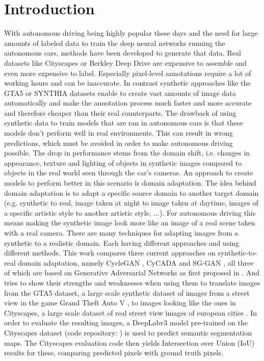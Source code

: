 \chapter{Introduction}
\label{sec:introduction}
With autonomous driving being highly popular these days and the need for large amounts of labeled data to train the deep neural networks running the autonomous cars, methods have been developed to generate that data. Real datasets like Cityscapes \cite{Cordts_2016_CVPR} or Berkley Deep Drive \cite{DBLP:journals/corr/abs-1805-04687} are expensive to assemble and even more expensive to label. Especially pixel-level annotations require a lot of working hours and can be inaccurate. In contrast synthetic approaches like the GTA5 \cite{Richter_2016_ECCV} or SYNTHIA \cite{RosCVPR16} datasets enable to create vast amounts of image data automatically and make the annotation process much faster and more accurate and therefore cheaper than their real counterparts. The drawback of using synthetic data to train models that are ran in autonomous cars is that these models don't perform well in real environments. This can result in wrong predictions, which must be avoided in order to make autonomous driving possible. The drop in performance stems from the domain shift, i.e. changes in appearance, texture and lighting of objects in synthetic images compared to objects in the real world seen through the car's cameras. An approach to create models to perform better in this scenario is domain adaptation. The idea behind domain adaptation is to adapt a specific source domain to another target domain (e.g. synthetic to real, image taken at night to image taken at daytime, images of a specific artistic style to another artistic style, ...). For autonomous driving this means making the synthetic image look more like an image of a real scene taken with a real camera. There are many techniques for adapting images from a synthetic to a realistic domain. Each having different approaches and using different methods. This work compares three current approaches on synthetic-to-real domain adaptation, namely CycleGAN \cite{DBLP:journals/corr/ZhuPIE17}, CyCADA \cite{DBLP:journals/corr/abs-1711-03213} and SG-GAN \cite{DBLP:journals/corr/abs-1801-01726}, all three of which are based on Generative Adversarial Networks as first proposed in \cite{NIPS2014_5423}. And tries to show their strengths and weaknesses when using them to translate images from the GTA5 dataset, a large scale synthetic dataset of images from a street view in the game Grand Theft Auto V \cite{Richter_2016_ECCV}, to images looking like the ones in Cityscapes, a large scale dataset of real street view images of european cities \cite{Cordts_2016_CVPR}. In order to evaluate the resulting images, a DeepLabv3 \cite{DBLP:journals/corr/ChenPSA17} model pre-trained on the Cityscapes dataset (code repository: \cite{DLR}) is used to predict semantic segmentation maps. The Cityscapes evaluation code \cite{CSR} then yields Intersection over Union (IoU) results for these, comparing predicted pixels with ground truth pixels. 